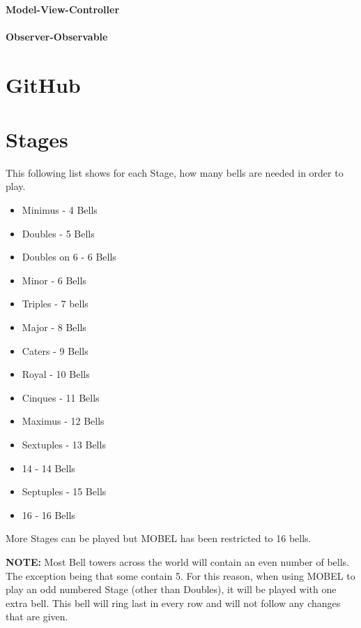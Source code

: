\documentclass{l4proj}
\begin{document}
\begin{appendices}
\subsubsection{Model-View-Controller}

\subsubsection{Observer-Observable}


\chapter{GitHub}

\chapter{Stages}\label{C}
This following list shows for each Stage, how many bells are needed in order to play.

\begin{itemize}
\item Minimus - 4 Bells
\item Doubles - 5 Bells
\item Doubles on 6 - 6 Bells 
\item Minor - 6 Bells
\item Triples - 7 bells
\item Major - 8 Bells
\item Caters - 9 Bells
\item Royal - 10 Bells
\item Cinques - 11 Bells
\item Maximus - 12 Bells
\item Sextuples - 13 Bells
\item 14 - 14 Bells
\item Septuples - 15 Bells
\item 16 - 16 Bells
\end{itemize}

More Stages can be played but MOBEL has been restricted to 16 bells.

\textbf{NOTE:} Most Bell towers across the world will contain an even number of bells.  The exception being that some contain 5.  For this reason, when using MOBEL to play an odd numbered Stage (other than Doubles), it will be played with one extra bell.  This bell will ring last in every row and will not follow any changes that are given.


\end{appendices}
\end{document}
